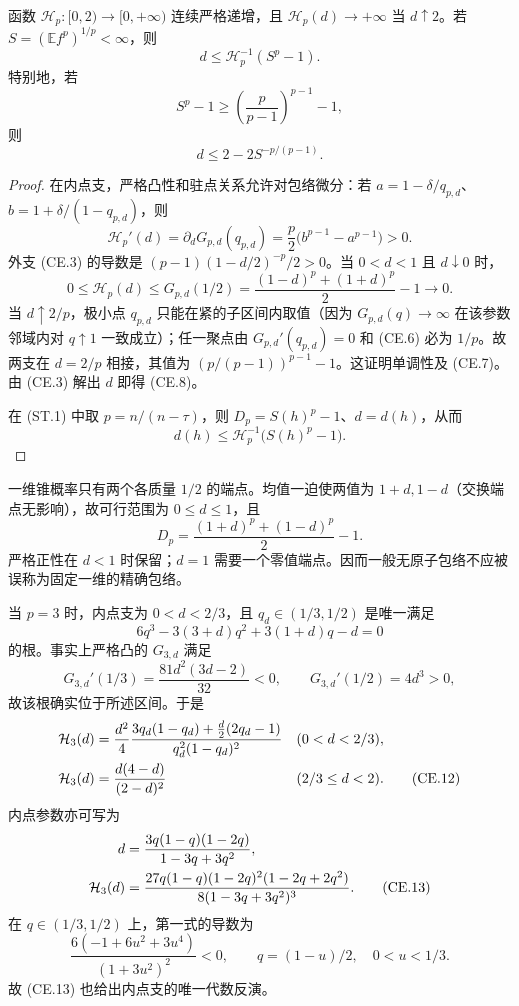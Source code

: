\begin{corollary}[单调包络与反演]
\label{cor:fixed-l1-lp-inverse}
函数 $\mathcal H_p:[0,2)\to[0,+\infty)$ 连续严格递增，且
$\mathcal H_p(d)\to+\infty$ 当 $d\uparrow2$。若
$S=(\mathbb Ef^p)^{1/p}<\infty$，则
\[
 d\le\mathcal H_p^{-1}(S^p-1). \tag{CE.7}
\]
特别地，若
\[
 S^p-1\ge\left(\frac p{p-1}\right)^{p-1}-1,
\]
则
\[
 d\le2-2S^{-p/(p-1)}. \tag{CE.8}
\]
\end{corollary}

\begin{proof}
在内点支，严格凸性和驻点关系允许对包络微分：若
$a=1-\delta/q_{p,d}$、$b=1+\delta/(1-q_{p,d})$，则
\[
 \mathcal H_p'(d)=\partial_dG_{p,d}(q_{p,d})
 =\frac p2\bigl(b^{p-1}-a^{p-1}\bigr)>0. \tag{CE.9}
\]
外支 (CE.3) 的导数是
$(p-1)(1-d/2)^{-p}/2>0$。当 $0<d<1$ 且 $d\downarrow0$ 时，
\[
 0\le\mathcal H_p(d)\le G_{p,d}(1/2)
 =\frac{(1-d)^p+(1+d)^p}{2}-1\longrightarrow0. \tag{CE.9a}
\]
当 $d\uparrow2/p$，极小点 $q_{p,d}$ 只能在紧的子区间内取值（因为
$G_{p,d}(q)\to\infty$ 在该参数邻域内对 $q\uparrow1$ 一致成立）；任一聚点由
$G_{p,d}'(q_{p,d})=0$ 和 (CE.6) 必为 $1/p$。故两支在 $d=2/p$ 相接，其值为
$(p/(p-1))^{p-1}-1$。这证明单调性及 (CE.7)。由 (CE.3) 解出 $d$ 即得 (CE.8)。

在 \textup{(ST.1)} 中取 $p=n/(n-\tau)$，则 $D_p=S(h)^p-1$、$d=d(h)$，从而
\[
 d(h)\le\mathcal H_p^{-1}\bigl(S(h)^p-1\bigr). \tag{CE.9b}
\]
\end{proof}

\begin{remark}[一维锥概率]
一维锥概率只有两个各质量 $1/2$ 的端点。均值一迫使两值为
$1+d,1-d$（交换端点无影响），故可行范围为 $0\le d\le1$，且
\[
 D_p=\frac{(1+d)^p+(1-d)^p}{2}-1. \tag{CE.10}
\]
严格正性在 $d<1$ 时保留；$d=1$ 需要一个零值端点。因而一般无原子包络不应被
误称为固定一维的精确包络。
\end{remark}

\begin{corollary}[三次包络的代数形式]
\label{cor:fixed-l1-cubic-envelope}
当 $p=3$ 时，内点支为 $0<d<2/3$，且 $q_d\in(1/3,1/2)$ 是唯一满足
\[
 6q^3-3(3+d)q^2+3(1+d)q-d=0 \tag{CE.11}
\]
的根。事实上严格凸的 $G_{3,d}$ 满足
\[
 G_{3,d}'(1/3)=\frac{81d^2(3d-2)}{32}<0,
 \qquad G_{3,d}'(1/2)=4d^3>0, \tag{CE.11a}
\]
故该根确实位于所述区间。于是
\begin{align}
 \mathcal H_3(d)&=\frac{d^2}{4}
 \frac{3q_d(1-q_d)+\frac d2(2q_d-1)}{q_d^2(1-q_d)^2}
 &&(0<d<2/3),\notag\\
 \mathcal H_3(d)&=\frac{d(4-d)}{(2-d)^2}
 &&(2/3\le d<2). \tag{CE.12}
\end{align}
内点参数亦可写为
\begin{align}
 d&=\frac{3q(1-q)(1-2q)}{1-3q+3q^2},\notag\\
 \mathcal H_3(d)&=
 \frac{27q(1-q)(1-2q)^2(1-2q+2q^2)}{8(1-3q+3q^2)^3}. \tag{CE.13}
\end{align}
在 $q\in(1/3,1/2)$ 上，第一式的导数为
\[
 \frac{6(-1+6u^2+3u^4)}{(1+3u^2)^2}<0,\qquad q=(1-u)/2,\quad0<u<1/3. \tag{CE.14}
\]
故 (CE.13) 也给出内点支的唯一代数反演。
\end{corollary}

